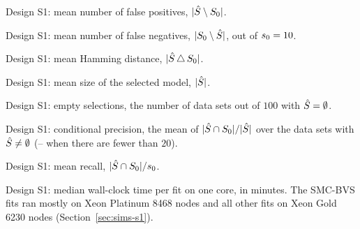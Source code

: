 \begin{table}[htbp]\centering\small
\caption{Design S1: mean number of false positives, $\abs{\Shat\setminus\Sz}$.}\label{tab:supp-s1-fp}

\end{table}

\begin{table}[htbp]\centering\small
\caption{Design S1: mean number of false negatives, $\abs{\Sz\setminus\Shat}$, out of $\sz=10$.}\label{tab:supp-s1-fn}

\end{table}

\begin{table}[htbp]\centering\small
\caption{Design S1: mean Hamming distance, $\abs{\Shat\,\triangle\,\Sz}$.}\label{tab:supp-s1-hamming}

\end{table}

\begin{table}[htbp]\centering\small
\caption{Design S1: mean size of the selected model, $\abs{\Shat}$.}\label{tab:supp-s1-size}

\end{table}

\begin{table}[htbp]\centering\small
\caption{Design S1: empty selections, the number of data sets out of $100$ with $\Shat=\emptyset$.}\label{tab:supp-s1-empty}

\end{table}

\begin{table}[htbp]\centering\small
\caption{Design S1: conditional precision, the mean of $\abs{\Shat\cap\Sz}/\abs{\Shat}$ over the data sets with
$\Shat\neq\emptyset$ (-- when there are fewer than $20$).}\label{tab:supp-s1-prec}

\end{table}

\begin{table}[htbp]\centering\small
\caption{Design S1: mean recall, $\abs{\Shat\cap\Sz}/\sz$.}\label{tab:supp-s1-rec}

\end{table}

\begin{table}[htbp]\centering\small
\caption{Design S1: median wall-clock time per fit on one core, in minutes. The SMC-BVS fits ran mostly on Xeon
Platinum 8468 nodes and all other fits on Xeon Gold 6230 nodes (Section~\ref{sec:sims-s1}).}\label{tab:supp-s1-wall}

\end{table}

